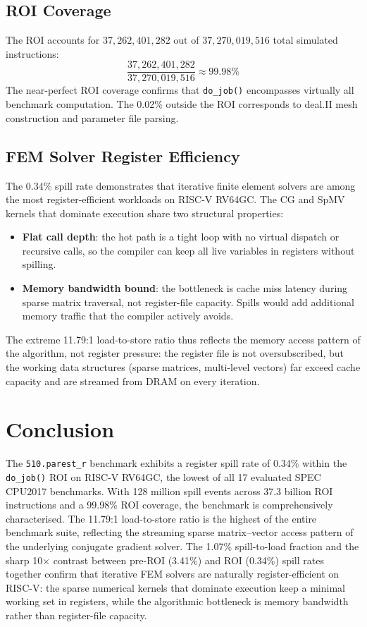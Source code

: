 \documentclass[conference]{IEEEtran}
\begin{document}
\subsection{ROI Coverage}

The ROI accounts for $37{,}262{,}401{,}282$ out of $37{,}270{,}019{,}516$
total simulated instructions:
\[
\frac{37{,}262{,}401{,}282}{37{,}270{,}019{,}516} \approx 99.98\%
\]
The near-perfect ROI coverage confirms that \texttt{do\_job()}
encompasses virtually all benchmark computation. The 0.02\% outside
the ROI corresponds to deal.II mesh construction and parameter file
parsing.

\subsection{FEM Solver Register Efficiency}

The 0.34\% spill rate demonstrates that iterative finite element
solvers are among the most register-efficient workloads on RISC-V
RV64GC. The CG and SpMV kernels that dominate execution share two
structural properties:
\begin{itemize}
    \item \textbf{Flat call depth}: the hot path is a tight loop with
          no virtual dispatch or recursive calls, so the compiler can
          keep all live variables in registers without spilling.
    \item \textbf{Memory bandwidth bound}: the bottleneck is cache
          miss latency during sparse matrix traversal, not
          register-file capacity. Spills would add additional memory
          traffic that the compiler actively avoids.
\end{itemize}
The extreme 11.79:1 load-to-store ratio thus reflects the memory
access pattern of the algorithm, not register pressure: the register
file is not oversubscribed, but the working data structures (sparse
matrices, multi-level vectors) far exceed cache capacity and are
streamed from DRAM on every iteration.

\section{Conclusion}

The \texttt{510.parest\_r} benchmark exhibits a register spill rate
of 0.34\% within the \texttt{do\_job()} ROI on RISC-V RV64GC, the
lowest of all 17 evaluated SPEC CPU2017 benchmarks. With 128 million
spill events across 37.3 billion ROI instructions and a 99.98\%
ROI coverage, the benchmark is comprehensively characterised. The
11.79:1 load-to-store ratio is the highest of the entire benchmark
suite, reflecting the streaming sparse matrix--vector access pattern
of the underlying conjugate gradient solver. The 1.07\% spill-to-load
fraction and the sharp 10$\times$ contrast between pre-ROI (3.41\%)
and ROI (0.34\%) spill rates together confirm that iterative FEM
solvers are naturally register-efficient on RISC-V: the sparse
numerical kernels that dominate execution keep a minimal working set
in registers, while the algorithmic bottleneck is memory bandwidth
rather than register-file capacity.
\end{document}
